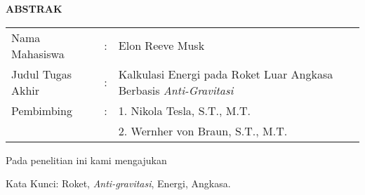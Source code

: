 \begin{center}
  \large\textbf{ABSTRAK}
\end{center}


\vspace{2ex}

\begingroup
  \setlength{\tabcolsep}{0pt}

  \noindent
  \begin{tabularx}{\textwidth}{l >{\centering}m{2em} X}
    Nama Mahasiswa    &:& Elon Reeve Musk \\

    Judul Tugas Akhir &:&	Kalkulasi Energi pada Roket Luar Angkasa Berbasis \emph{Anti-Gravitasi} \\

    Pembimbing        &:& 1. Nikola Tesla, S.T., M.T. \\
                      & & 2. Wernher von Braun, S.T., M.T. \\
  \end{tabularx}
\endgroup

Pada penelitian ini kami mengajukan \lipsum[1]

Kata Kunci: Roket, \emph{Anti-gravitasi}, Energi, Angkasa.
